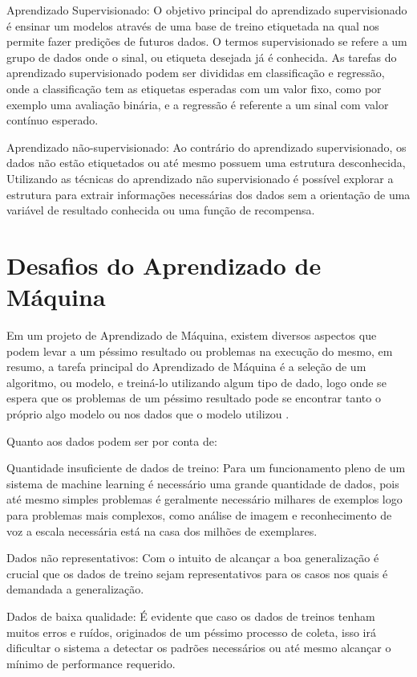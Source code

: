 Aprendizado Supervisionado: O objetivo principal do aprendizado supervisionado é ensinar um modelos através de uma base de treino etiquetada na qual nos permite fazer predições de futuros dados. O termos supervisionado se refere a um grupo de dados onde o sinal, ou etiqueta desejada já é conhecida. As tarefas do aprendizado supervisionado podem ser divididas em classificação e regressão, onde a classificação tem as etiquetas esperadas com um valor fixo, como por exemplo uma avaliação binária, e a regressão é referente a um sinal com valor contínuo esperado.

Aprendizado não-supervisionado: Ao contrário do aprendizado supervisionado, os dados não estão etiquetados ou até mesmo possuem uma estrutura desconhecida, Utilizando as técnicas do aprendizado não supervisionado é possível explorar a estrutura para extrair informações necessárias dos dados sem a orientação de uma variável de resultado conhecida ou uma função de recompensa.

\section{Desafios do Aprendizado de Máquina}
Em um projeto de Aprendizado de Máquina, existem diversos aspectos que podem levar a um péssimo resultado ou problemas na execução do mesmo, em resumo, a tarefa principal do Aprendizado de Máquina é a seleção de um algoritmo, ou modelo, e treiná-lo utilizando algum tipo de dado, logo onde se espera que os problemas de um péssimo resultado pode se encontrar tanto o próprio algo modelo ou nos dados que o modelo utilizou \cite{Aurélien}.

Quanto aos dados podem ser por conta de:

Quantidade insuficiente de dados de treino: Para um funcionamento pleno de um sistema de machine learning  é necessário uma grande quantidade de dados, pois até mesmo simples problemas é geralmente necessário milhares de exemplos logo para problemas mais complexos, como análise de imagem e reconhecimento de voz a escala necessária está na casa dos milhões de exemplares.

Dados não representativos: Com o intuito de alcançar a boa generalização é crucial que os dados de treino sejam representativos para os casos nos quais é demandada a generalização.

Dados de baixa qualidade: É evidente que caso os dados de treinos tenham muitos erros e ruídos, originados de um péssimo processo de coleta, isso irá dificultar o sistema a detectar os padrões necessários ou até mesmo alcançar o mínimo de performance requerido. 
	
